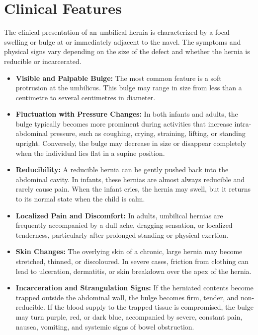 \section*{Clinical Features}
The clinical presentation of an umbilical hernia is characterized by a focal swelling or bulge at or immediately adjacent to the navel. The symptoms and physical signs vary depending on the size of the defect and whether the hernia is reducible or incarcerated.
\begin{itemize}
    \item \textbf{Visible and Palpable Bulge:} The most common feature is a soft protrusion at the umbilicus. This bulge may range in size from less than a centimetre to several centimetres in diameter.
    \item \textbf{Fluctuation with Pressure Changes:} In both infants and adults, the bulge typically becomes more prominent during activities that increase intra-abdominal pressure, such as coughing, crying, straining, lifting, or standing upright. Conversely, the bulge may decrease in size or disappear completely when the individual lies flat in a supine position.
    \item \textbf{Reducibility:} A reducible hernia can be gently pushed back into the abdominal cavity. In infants, these hernias are almost always reducible and rarely cause pain. When the infant cries, the hernia may swell, but it returns to its normal state when the child is calm.
    \item \textbf{Localized Pain and Discomfort:} In adults, umbilical hernias are frequently accompanied by a dull ache, dragging sensation, or localized tenderness, particularly after prolonged standing or physical exertion.
    \item \textbf{Skin Changes:} The overlying skin of a chronic, large hernia may become stretched, thinned, or discoloured. In severe cases, friction from clothing can lead to ulceration, dermatitis, or skin breakdown over the apex of the hernia.
    \item \textbf{Incarceration and Strangulation Signs:} If the herniated contents become trapped outside the abdominal wall, the bulge becomes firm, tender, and non-reducible. If the blood supply to the trapped tissue is compromised, the bulge may turn purple, red, or dark blue, accompanied by severe, constant pain, nausea, vomiting, and systemic signs of bowel obstruction.
\end{itemize}

